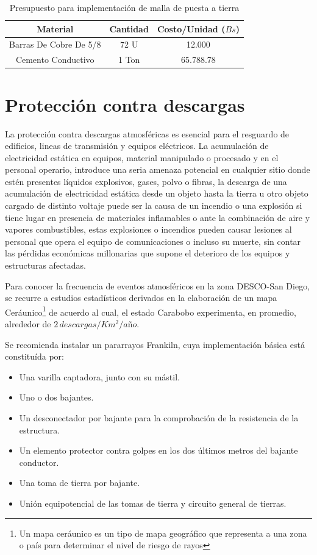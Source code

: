 \documentclass[11pt, a4paper, twosides]{report}
\begin{document}
\begin{table}[h]
    \centering
    \begin{tabular}{|c|c|c|}
        \hline
        \cellcolor{gray75} \textbf{Material} & \cellcolor{gray75} \textbf{Cantidad} & \cellcolor{gray75} \textbf{Costo/Unidad ($ Bs $)} \\ \hline
        Barras De Cobre De 5/8 & 72 U & 12.000 \\ \hline
        Cemento Conductivo & 1 Ton & 65.788.78 \\ \hline
    \end{tabular}
    \caption{Presupuesto para implementación de malla de puesta a tierra}
    \end{table}

\section{Protección contra descargas}
 La protección contra descargas atmosféricas es esencial para el resguardo de edificios, lineas de transmisión y equipos eléctricos\cite{howell82}. La acumulación de electricidad estática  en equipos, material manipulado o procesado y en el personal operario, introduce una seria amenaza potencial en cualquier sitio donde estén presentes líquidos explosivos, gases, polvo o fibras, la descarga de una acumulación de electricidad estática desde un objeto hasta la tierra u otro objeto cargado de distinto voltaje puede ser la causa de un incendio o una explosión si tiene lugar en presencia de materiales inflamables o ante la combinación de aire y vapores combustibles, estas explosiones o incendios pueden causar lesiones al personal que opera el equipo de comunicaciones o incluso su muerte, sin contar las pérdidas económicas millonarias que supone el deterioro de los equipos y estructuras afectadas.
 
  Para conocer la frecuencia de eventos atmosféricos en la zona DESCO-San Diego, se recurre a estudios estadísticos  derivados en la elaboración de un mapa Ceráunico\footnote{Un mapa ceráunico es un tipo de mapa geográfico que representa a una zona o país para determinar el nivel de riesgo de rayos} de acuerdo al cual, el estado Carabobo experimenta, en promedio, alrededor de $2 \, descargas/Km^{2}/año$. 
  
  Se recomienda instalar un pararrayos Frankiln, cuya implementación básica  está constituída por:

\begin{itemize}
    \item Una varilla captadora, junto con su mástil.
    \item Uno o dos bajantes.
    \item Un desconectador por bajante para la comprobación de la resistencia de la estructura.
    \item Un elemento protector contra golpes en los dos últimos metros del bajante conductor.
    \item Una toma de tierra por bajante.
    \item Unión equipotencial de las tomas de tierra y circuito general de tierras.
\end{itemize}
\end{document}
